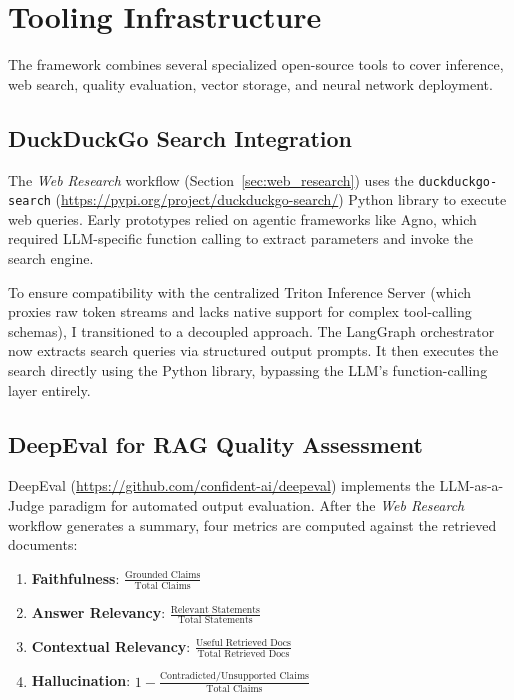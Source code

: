 \section{Tooling Infrastructure}
\label{sec:tools}

The framework combines several specialized open-source tools to cover inference, web search, quality evaluation, vector storage, and neural network deployment.

\subsection{DuckDuckGo Search Integration}

The \textit{Web Research} workflow (Section~\ref{sec:web_research}) uses the \texttt{duckduckgo-search} (\url{https://pypi.org/project/duckduckgo-search/}) Python library to execute web queries. Early prototypes relied on agentic frameworks like Agno, which required LLM-specific function calling to extract parameters and invoke the search engine.

To ensure compatibility with the centralized Triton Inference Server (which proxies raw token streams and lacks native support for complex tool-calling schemas), I transitioned to a decoupled approach. The LangGraph orchestrator now extracts search queries via structured output prompts. It then executes the search directly using the Python library, bypassing the LLM's function-calling layer entirely.

\subsection{DeepEval for RAG Quality Assessment}

DeepEval (\url{https://github.com/confident-ai/deepeval}) implements the LLM-as-a-Judge paradigm for automated output evaluation. After the \textit{Web Research} workflow generates a summary, four metrics are computed against the retrieved documents:

\begin{enumerate}
    \item \textbf{Faithfulness}: $\frac{\text{Grounded Claims}}{\text{Total Claims}}$
    \item \textbf{Answer Relevancy}: $\frac{\text{Relevant Statements}}{\text{Total Statements}}$
    \item \textbf{Contextual Relevancy}: $\frac{\text{Useful Retrieved Docs}}{\text{Total Retrieved Docs}}$
    \item \textbf{Hallucination}: $1 - \frac{\text{Contradicted/Unsupported Claims}}{\text{Total Claims}}$
\end{enumerate}

